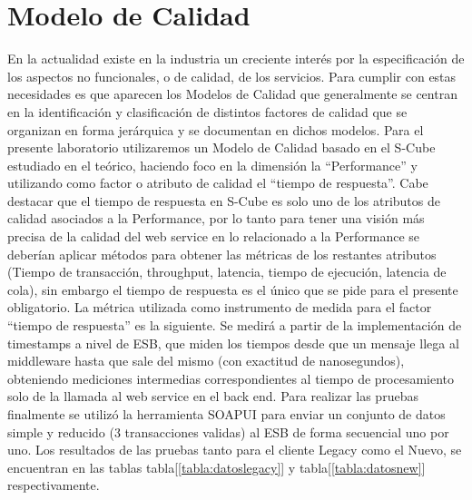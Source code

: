 \documentclass[12pt]{article}
\begin{document}
\section{Modelo de Calidad}
En la actualidad existe en la industria un creciente interés por la especificación de los aspectos no funcionales, o de calidad, de los servicios. Para cumplir con estas necesidades es que aparecen los Modelos de Calidad que generalmente se centran en la identificación y clasificación de distintos factores de calidad que se organizan en forma jerárquica y se documentan en dichos modelos.
Para el presente laboratorio utilizaremos un Modelo de Calidad basado en el S-Cube estudiado en el teórico, haciendo foco en la dimensión la “Performance” y utilizando como factor o atributo de calidad el “tiempo de respuesta”. Cabe destacar que el tiempo de respuesta en  S-Cube es solo uno de los atributos de calidad asociados a la Performance, por lo tanto para tener una visión más precisa de la calidad del web service en lo relacionado a la Performance se deberían aplicar métodos para obtener las métricas de los restantes atributos (Tiempo de transacción, throughput, latencia, tiempo de ejecución, latencia de cola), sin embargo el tiempo de respuesta es el único que se pide para el presente obligatorio.
La métrica utilizada como instrumento de medida para el factor “tiempo de respuesta” es la siguiente. Se medirá a partir de la implementación de timestamps a nivel de ESB, que miden los tiempos desde que un mensaje llega al middleware hasta que sale del mismo (con exactitud de nanosegundos), obteniendo mediciones intermedias correspondientes al tiempo de procesamiento solo de la llamada al web service en el back end.
Para realizar las pruebas finalmente se utilizó la herramienta SOAPUI para enviar un conjunto de datos simple y reducido (3 transacciones validas) al ESB de forma secuencial uno por uno.
Los resultados de las pruebas tanto para el cliente Legacy como el Nuevo, se encuentran en las tablas tabla[\ref{tabla:datoslegacy}] y tabla[\ref{tabla:datosnew}] respectivamente.
\end{document}
